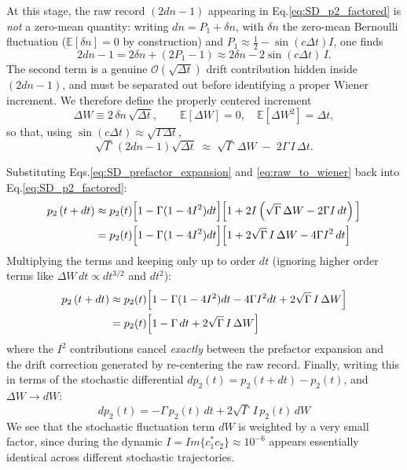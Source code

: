 \documentclass[a4paper,12pt]{article}
\begin{document}
At this stage, the raw record $(2dn-1)$ appearing in Eq.\ref{eq:SD_p2_factored} is \emph{not} a zero-mean quantity: writing $ dn = P_{1} + \delta n $, with $ \delta n $ the zero-mean Bernoulli fluctuation ($ \mathbb{E}[\delta n] = 0 $ by construction) and $ P_{1} \approx \tfrac{1}{2} - \sin(c\Delta t) I $, one finds
\begin{equation}
	2dn - 1 = 2\delta n + \left(2P_{1} - 1\right) \approx 2\delta n - 2\sin(c\Delta t)\, I .
	\label{eq:raw_record_decomposition}
\end{equation}
The second term is a genuine $ \mathcal{O}(\sqrt{\Delta t}) $ drift contribution hidden inside $(2dn-1)$, and must be separated out before identifying a proper Wiener increment. We therefore define the properly centered increment
\begin{equation}
	\Delta W \equiv 2\,\delta n\, \sqrt{\Delta t}, \qquad \mathbb{E}[\Delta W] = 0,\quad \mathbb{E}[\Delta W^{2}] = \Delta t ,
	\label{eq:proper_wiener_increment}
\end{equation}
so that, using $ \sin(c\Delta t) \approx \sqrt{\Gamma \Delta t} $,
\begin{equation}
	\sqrt{\Gamma}\, (2dn-1)\sqrt{\Delta t} \;\approx\; \sqrt{\Gamma}\,\Delta W \;-\; 2\Gamma\, I\, \Delta t .
	\label{eq:raw_to_wiener}
\end{equation}

Substituting Eqs.\ref{eq:SD_prefactor_expansion} and \ref{eq:raw_to_wiener} back into Eq.\ref{eq:SD_p2_factored}:
\begin{align}
	p_{2} \left( t + dt \right) &\approx p_{2}(t) \Big[ 1 - \Gamma (1 - 4I^{2}) dt \Big] \Big[ 1 + 2I \left( \sqrt{\Gamma}\,\Delta W - 2\Gamma I\, dt \right) \Big] \notag \\
	&= p_{2}(t) \Big[ 1 - \Gamma (1 - 4I^{2}) dt \Big] \Big[ 1 + 2\sqrt{\Gamma}\, I\, \Delta W - 4\Gamma I^{2}\, dt \Big]
\end{align}
Multiplying the terms and keeping only up to order $dt$ 
(ignoring higher order terms like $\Delta W\, dt \propto dt^{3/2}$ and $dt^2$):
\begin{align}
	p_{2} \left( t + dt \right) &\approx p_{2}(t) \Big[ 1 - \Gamma (1 - 4I^{2}) dt - 4\Gamma I^{2} dt + 2\sqrt{\Gamma}\, I\, \Delta W \Big] \notag \\
	&= p_{2}(t) \Big[ 1 - \Gamma\, dt + 2\sqrt{\Gamma}\, I\, \Delta W \Big]
\end{align}
where the $I^2$ contributions cancel \emph{exactly} between the prefactor expansion and the drift correction generated by re-centering the raw record. Finally, writing this in terms of the stochastic differential $dp_2(t) = p_2(t + dt) - p_2(t)$, and $\Delta W \to dW$:
\begin{equation}
	dp_{2}(t) = - \Gamma\, p_{2}(t)\, dt + 2 \sqrt{\Gamma}\, I\, p_{2}(t)\, dW
	\label{eq:SD_p2_final}
\end{equation}
We see that the stochastic fluctuation term $ dW $ is weighted by a very small factor, since during the dynamic $ I = Im \{ c_{1}^{*} c_{2} \} \approx 10^{-6} $ appears essentially identical across different stochastic trajectories.
\end{document}
